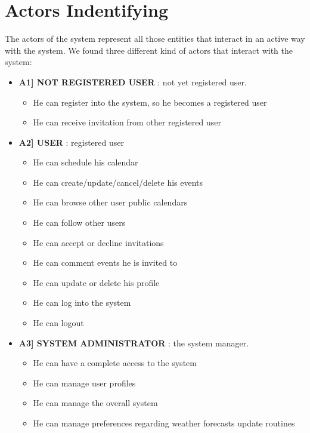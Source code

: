 \documentclass[12pt]{book}
\begin{document}
\chapter{Actors Indentifying}

The actors of the system represent all those entities that interact in an active way with the system. We found three different kind of actors that interact with the system: 
\begin{itemize}
	\item \textbf{ A1] NOT REGISTERED USER } : not yet registered user. 
		\begin{itemize}
			\item He can register into the system, so he becomes a registered user\\
			\item He can receive invitation from other registered user\\
		\end{itemize}
	\item \textbf{ A2] USER } : registered user   
		\begin{itemize}
			\item He can schedule his calendar\\
			\item He can create/update/cancel/delete his events\\
			\item He can browse other user public calendars \\
			\item He can follow other users \\
			\item He can accept or decline invitations \\
			\item He can comment events he is invited to \\
			\item He can update or delete his profile \\
			\item He can log into the system\\
			\item He can logout \\
		\end{itemize}
	\item \textbf{ A3] SYSTEM ADMINISTRATOR } : the system manager. 
		\begin{itemize}
			\item He can have a complete access to the system\\
			\item He can manage user profiles \\
			\item He can manage the overall system \\
			\item He can manage preferences regarding weather forecasts update routines \\
		\end{itemize}
\end{itemize}
\end{document}
